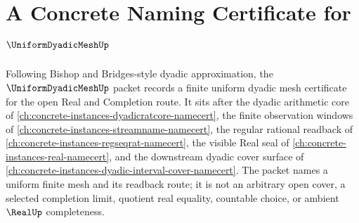 \chapter{A Concrete Naming Certificate for $\UniformDyadicMeshUp$}
\label{ch:concrete-instances-uniform-dyadic-mesh-namecert}

Following Bishop and Bridges-style dyadic approximation, the $\UniformDyadicMeshUp$ packet records a finite uniform dyadic mesh certificate for the open Real and Completion route. It sits after the dyadic arithmetic core of \autoref{ch:concrete-instances-dyadicratcore-namecert}, the finite observation windows of \autoref{ch:concrete-instances-streamname-namecert}, the regular rational readback of \autoref{ch:concrete-instances-regseqrat-namecert}, the visible Real seal of \autoref{ch:concrete-instances-real-namecert}, and the downstream dyadic cover surface of \autoref{ch:concrete-instances-dyadic-interval-cover-namecert}. The packet names a uniform finite mesh and its readback route; it is not an arbitrary open cover, a selected completion limit, quotient real equality, countable choice, or ambient $\RealUp$ completeness.

